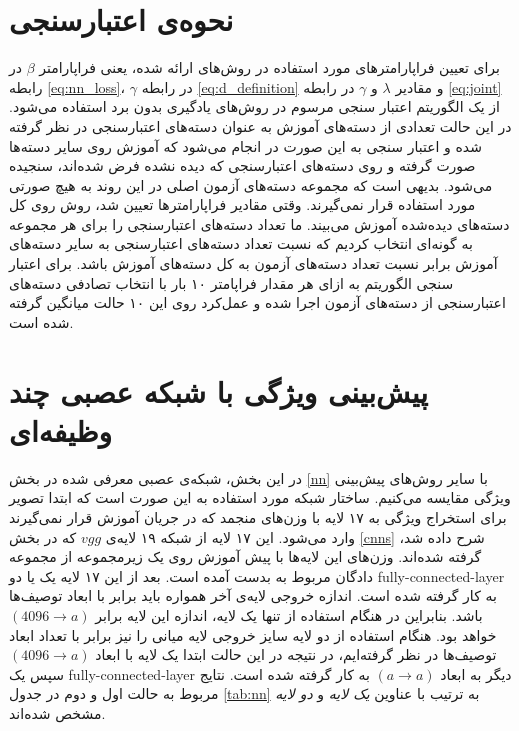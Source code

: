 \section{نحوه‌ی اعتبارسنجی}\label{exp:validation}
برای تعیین فراپارامترهای مورد استفاده در روش‌های ارائه شده، یعنی  فراپارامتر $\beta$ در رابطه \eqref{eq:nn_loss}،
 $\gamma$ در رابطه \eqref{eq:d_definition} و مقادیر $\lambda$ و $\gamma$ در رابطه \eqref{eq:joint} از یک الگوریتم اعتبار سنجی مرسوم در روش‌های یادگیری بدون برد استفاده می‌شود.
در این حالت تعدادی از دسته‌های آموزش به عنوان دسته‌های اعتبارسنجی در نظر گرفته شده و اعتبار سنجی به این صورت در انجام می‌شود که آموزش روی سایر دسته‌ها صورت گرفته و روی دسته‌های اعتبارسنجی که دیده نشده فرض شده‌اند، سنجیده می‌شود. بدیهی است که مجموعه‌ دسته‌های آزمون اصلی در این روند به هیچ صورتی مورد استفاده قرار نمی‌گیرند. وقتی مقادیر فراپارامترها تعیین شد، روش روی کل دسته‌های دیده‌شده آموزش می‌بیند. ما تعداد دسته‌های اعتبارسنجی را برای هر مجموعه به گونه‌ای انتخاب کردیم که نسبت تعداد دسته‌های اعتبارسنجی به سایر دسته‌های آموزش برابر نسبت تعداد دسته‌های آزمون به کل دسته‌های آموزش باشد. برای اعتبار سنجی الگوریتم به ازای هر مقدار فراپامتر ۱۰ بار با انتخاب تصادفی دسته‌های اعتبارسنجی از دسته‌های آزمون اجرا شده و عمل‌کرد روی این ۱۰ حالت میانگین گرفته شده است.
%
\section{پیش‌بینی ویژگی با شبکه عصبی چند وظیفه‌ای}

در این بخش، شبکه‌ی عصبی معرفی شده در بخش \ref{nn} با سایر روش‌های پیش‌بینی ویژگی مقایسه می‌کنیم.
ساختار شبکه مورد استفاده به این صورت است که ابتدا تصویر برای استخراج ویژگی به ۱۷ لایه با وزن‌های منجمد که در جریان آموزش قرار نمی‌گیرند وارد می‌شود. این ۱۷ لایه از شبکه ۱۹ لایه‌ی $vgg$ که در بخش
\ref{cnns}
شرح داده شد، گرفته شده‌اند. وزن‌های این لایه‌ها با پیش آموزش روی یک زیرمجموعه از مجموعه دادگان  مربوط به  بدست آمده است.
بعد از این ۱۷ لایه یک یا دو \gls{fully-connected-layer} به کار گرفته شده است. اندازه خروجی لایه‌ی آخر همواره باید برابر با ابعاد توصیف‌ها باشد. بنابراین در هنگام استفاده از تنها یک لایه، اندازه این لایه برابر
$(4096 \rightarrow a)$
خواهد بود. هنگام استفاده از دو لایه سایز خروجی لایه میانی را نیز برابر با تعداد ابعاد توصیف‌ها در نظر گرفته‌ایم، در نتیجه در این حالت ابتدا یک لایه با ابعاد
$(4096 \rightarrow a)$
سپس یک \gls{fully-connected-layer} دیگر به ابعاد
$(a \rightarrow a)$
به کار گرفته شده است. نتایج مربوط به حالت اول و دوم  در جدول \ref{tab:nn} به ترتیب با عناوین
\textit{ یک لایه}
و
\textit{ دو لایه}
مشخص شده‌اند.

